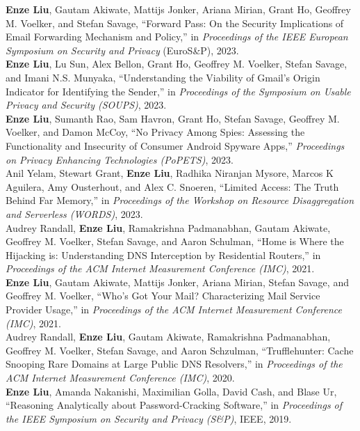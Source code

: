 \documentclass[12pt]{ucsddissertation}
\begin{document}
\begin{vita}
\noindent \textbf{Enze Liu}, Gautam Akiwate, Mattijs Jonker, Ariana Mirian, Grant Ho, Geoffrey M. Voelker, and Stefan Savage, ``Forward Pass: On the Security Implications of Email Forwarding Mechanism and Policy,'' in \textit{Proceedings of the IEEE European Symposium on Security and Privacy} (EuroS\&P), 2023.\\

\noindent \textbf{Enze Liu}, Lu Sun, Alex Bellon, Grant Ho, Geoffrey M. Voelker, Stefan Savage, and Imani N.S. Munyaka, ``Understanding the Viability of Gmail's Origin Indicator for Identifying the Sender,'' in \textit{Proceedings of the Symposium on Usable Privacy and Security (SOUPS)}, 2023.\\

\noindent \textbf{Enze Liu}, Sumanth Rao, Sam Havron, Grant Ho, Stefan Savage, Geoffrey M. Voelker, and Damon McCoy, ``No Privacy Among Spies: Assessing the Functionality and Insecurity of Consumer Android Spyware Apps,'' \textit{Proceedings on Privacy Enhancing Technologies (PoPETS)}, 2023.\\

\noindent Anil Yelam, Stewart Grant, \textbf{Enze Liu}, Radhika Niranjan Mysore, Marcos K Aguilera, Amy Ousterhout, and Alex C. Snoeren, ``Limited Access: The Truth Behind Far Memory,'' in \textit{Proceedings of the
Workshop on Resource Disaggregation and Serverless (WORDS)}, 2023.\\

\noindent Audrey Randall, \textbf{Enze Liu}, Ramakrishna Padmanabhan, Gautam Akiwate, Geoffrey M. Voelker, Stefan Savage, and Aaron Schulman, ``Home is Where the Hijacking is: Understanding DNS Interception by Residential Routers,'' in \textit{Proceedings of the ACM Internet Measurement Conference (IMC)}, 2021.\\

\noindent \textbf{Enze Liu}, Gautam Akiwate, Mattijs Jonker, Ariana Mirian, Stefan Savage, and Geoffrey M. Voelker, ``Who's Got Your Mail? Characterizing Mail Service Provider Usage,'' in \textit{Proceedings of the ACM Internet Measurement Conference (IMC)}, 2021.\\

\noindent Audrey Randall, \textbf{Enze Liu}, Gautam Akiwate, Ramakrishna Padmanabhan, Geoffrey M. Voelker, Stefan Savage, and Aaron Schzulman, ``Trufflehunter: Cache Snooping Rare Domains at Large Public DNS Resolvers,'' in \textit{Proceedings of the ACM Internet Measurement Conference (IMC)}, 2020.\\ 

\noindent \textbf{Enze Liu}, Amanda Nakanishi, Maximilian Golla, David Cash, and Blase Ur, ``Reasoning Analytically about Password-Cracking Software,'' in \textit{Proceedings of the IEEE Symposium on Security and Privacy (S\&P)}, IEEE, 2019.\\
\end{vita}
\end{document}
